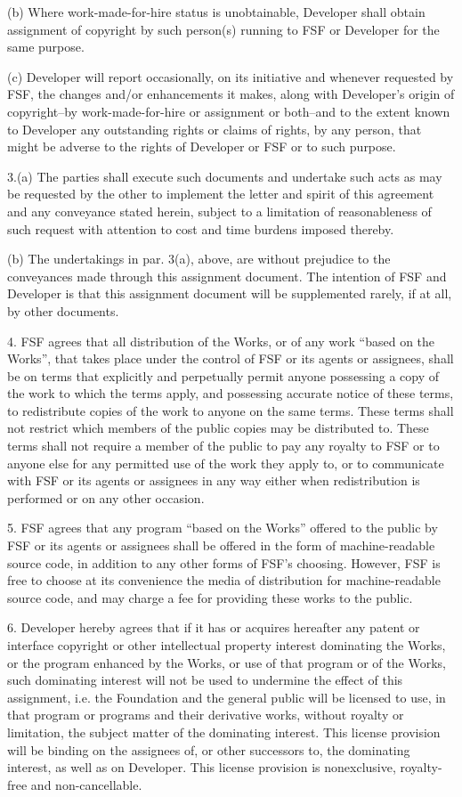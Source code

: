 \documentclass[a4paper,12pt]{article}
\begin{document}
 (b) Where work-made-for-hire status is unobtainable, Developer shall
 obtain assignment of copyright by such person(s) running to FSF or
 Developer for the same purpose.
 
 (c) Developer will report occasionally, on its initiative and whenever
 requested by FSF, the changes and/or enhancements it makes, along with
 Developer's origin of copyright--by work-made-for-hire or assignment
 or both--and to the extent known to Developer any outstanding rights
 or claims of rights, by any person, that might be adverse to the
 rights of Developer or FSF or to such purpose.
 
 3.(a) The parties shall execute such documents and undertake such acts
 as may be requested by the other to implement the letter and spirit of
 this agreement and any conveyance stated herein, subject to a
 limitation of reasonableness of such request with attention to cost
 and time burdens imposed thereby.
 
 (b) The undertakings in par. 3(a), above, are without prejudice to the
 conveyances made through this assignment document.  The intention of
 FSF and Developer is that this assignment document will be
 supplemented rarely, if at all, by other documents.
 
 4. FSF agrees that all distribution of the Works, or of any work
 ``based on the Works'', that takes place under the control of FSF or its
 agents or assignees, shall be on terms that explicitly and perpetually
 permit anyone possessing a copy of the work to which the terms apply,
 and possessing accurate notice of these terms, to redistribute copies
 of the work to anyone on the same terms.  These terms shall not
 restrict which members of the public copies may be distributed to.
 These terms shall not require a member of the public to pay any
 royalty to FSF or to anyone else for any permitted use of the work
 they apply to, or to communicate with FSF or its agents or assignees
 in any way either when redistribution is performed or on any other
 occasion.
 
 5. FSF agrees that any program ``based on the Works'' offered to the
 public by FSF or its agents or assignees shall be offered in the form
 of machine-readable source code, in addition to any other forms of
 FSF's choosing.  However, FSF is free to choose at its convenience the
 media of distribution for machine-readable source code, and may charge
 a fee for providing these works to the public.
 
 6. Developer hereby agrees that if it has or acquires hereafter any
 patent or interface copyright or other intellectual property interest
 dominating the Works, or the program enhanced by the Works, or use of
 that program or of the Works, such dominating interest will not be
 used to undermine the effect of this assignment, i.e. the Foundation
 and the general public will be licensed to use, in that program or
 programs and their derivative works, without royalty or limitation,
 the subject matter of the dominating interest.  This license provision
 will be binding on the assignees of, or other successors to, the
 dominating interest, as well as on Developer.  This license provision
 is nonexclusive, royalty-free and non-cancellable.
 
\end{document}
